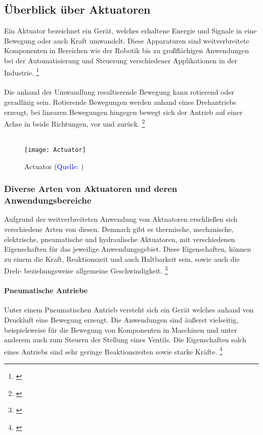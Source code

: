 \documentclass[titlepage,12pt,twoside]{article}
\begin{document}
\subsection{Überblick über Aktuatoren}
Ein Aktuator bezeichnet ein Gerät, welches erhaltene Energie und Signale 
in eine Bewegung oder auch Kraft umwandelt. Diese Apparaturen sind 
weitverbreitete Komponenten in Bereichen wie der Robotik bis zu 
großflächigen Anwendungen bei der Automatisierung und Steuerung 
verschiedener Applikationen in der Industrie. \footnote{\cite{Q1}} \\
\\
Die anhand der Umwandlung resultierende Bewegung kann rotierend oder 
geradlinig sein. Rotierende Bewegungen werden anhand eines Drehantriebs 
erzeugt, bei linearen Bewegungen hingegen bewegt sich der Antrieb auf 
einer Achse in beide Richtungen, vor und zurück. \footnote{\cite{Q4}} \\
\\
\begin{figure}[H]
	\begin{center}
		\scalebox{0.8}
		{\texttt{[image: Actuator]}}
		\caption{Actuator (\textcolor{blue}{Quelle: \cite{Q4}})}
		\label{fig:Actuator}
	\end{center}
\end{figure}
\subsubsection{Diverse Arten von Aktuatoren und deren Anwendungsbereiche}
Aufgrund der weitverbreiteten Anwendung von Aktuatoren erschließen sich 
verschiedene Arten von diesen. Demnach gibt es thermische, mechanische, 
elektrische, pneumatische und hydraulische Aktuatoren, mit verschiedenen 
Eigenschaften für das jeweilige Anwendungsgebiet. Diese Eigenschaften, 
können zu einem die Kraft, Reaktionszeit und auch Haltbarkeit sein, 
sowie auch die Dreh- beziehungsweise allgemeine Geschwindigkeit. \footnote{\cite{Q1}} \\
\paragraph{Pneumatische Antriebe}
\hfill \break
\hfill \break
Unter einem Pneumatischen Antrieb versteht sich ein Gerät welches anhand 
von Druckluft eine Bewegung erzeugt. Die Anwendungen sind äußerst 
vielseitig, beispielsweise für die Bewegung von Komponenten in Maschinen 
und unter anderem auch zum Steuern der Stellung eines Ventils. Die 
Eigenschaften solch eines Antriebs sind sehr geringe Reaktionszeiten 
sowie starke Kräfte. \footnote{\cite{Q1}} \\
\end{document}
